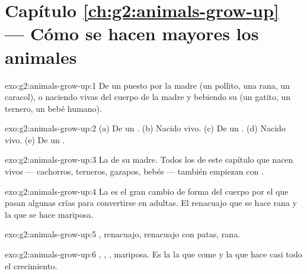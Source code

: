 \section*{Capítulo \ref{ch:g2:animals-grow-up} --- Cómo se hacen mayores los animales}

\begin{solution}{exo:g2:animals-grow-up:1}
De un  puesto por la madre (un pollito, una rana, un caracol), o
naciendo vivas del cuerpo de la madre y bebiendo su  (un gatito,
un ternero, un bebé humano).
\end{solution}

\begin{solution}{exo:g2:animals-grow-up:2}
(a) De un . (b) Nacido vivo. (c) De un . (d) Nacido vivo.
(e) De un .
\end{solution}

\begin{solution}{exo:g2:animals-grow-up:3}
La  de su madre. Todos los  de este capítulo que nacen
vivos --- cachorros, terneros, gazapos, bebés --- también empiezan con .
\end{solution}

\begin{solution}{exo:g2:animals-grow-up:4}
La  es el gran cambio de forma del cuerpo por el que pasan
algunas crías para convertirse en adultas. El renacuajo que se hace
rana y la  que se hace mariposa.
\end{solution}

\begin{solution}{exo:g2:animals-grow-up:5}
, renacuajo, renacuajo con patas, rana.
\end{solution}

\begin{solution}{exo:g2:animals-grow-up:6}
, , , mariposa. Es la  la que come  y la
que hace casi todo el crecimiento.
\end{solution}

